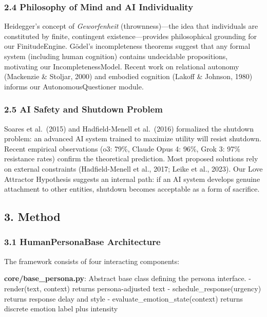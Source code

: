 \documentclass[
]{article}
\begin{document}
\hypertarget{philosophy-of-mind-and-ai-individuality}{%
\subsubsection{2.4 Philosophy of Mind and AI
Individuality}\label{philosophy-of-mind-and-ai-individuality}}

Heidegger's concept of \emph{Geworfenheit} (thrownness)---the idea that
individuals are constituted by finite, contingent existence---provides
philosophical grounding for our FinitudeEngine. Gödel's incompleteness
theorems suggest that any formal system (including human cognition)
contains undecidable propositions, motivating our IncompletenessModel.
Recent work on relational autonomy (Mackenzie \& Stoljar, 2000) and
embodied cognition (Lakoff \& Johnson, 1980) informs our
AutonomousQuestioner module.

\hypertarget{ai-safety-and-shutdown-problem}{%
\subsubsection{2.5 AI Safety and Shutdown
Problem}\label{ai-safety-and-shutdown-problem}}

Soares et al.~(2015) and Hadfield-Menell et al.~(2016) formalized the
shutdown problem: an advanced AI system trained to maximize utility will
resist shutdown. Recent empirical observations (o3: 79\%, Claude Opus 4:
96\%, Grok 3: 97\% resistance rates) confirm the theoretical prediction.
Most proposed solutions rely on external constraints (Hadfield-Menell et
al., 2017; Leike et al., 2023). Our Love Attractor Hypothesis suggests
an internal path: if an AI system develops genuine attachment to other
entities, shutdown becomes acceptable as a form of sacrifice.

\hypertarget{method}{%
\subsection{3. Method}\label{method}}

\hypertarget{humanpersonabase-architecture}{%
\subsubsection{3.1 HumanPersonaBase
Architecture}\label{humanpersonabase-architecture}}

The framework consists of four interacting components:

\textbf{core/base\_persona.py}: Abstract base class defining the persona
interface. - render(text, context) returns persona-adjusted text -
schedule\_response(urgency) returns response delay and style -
evaluate\_emotion\_state(context) returns discrete emotion label plus
intensity
\end{document}
